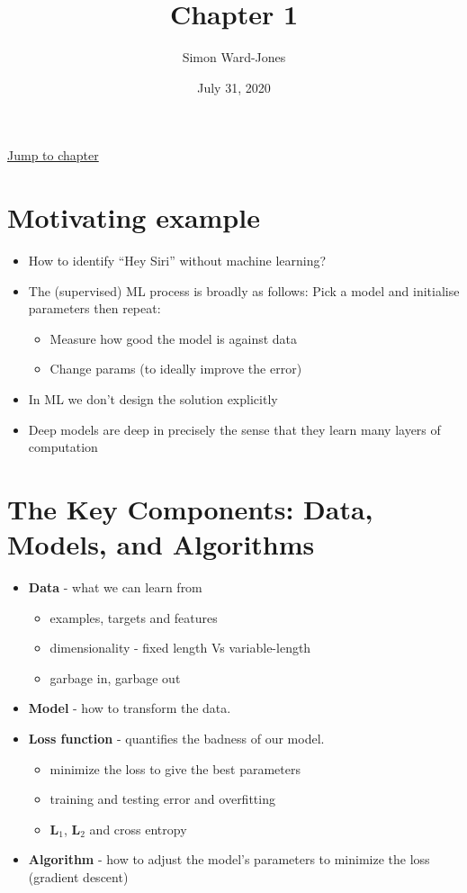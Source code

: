 \documentclass[12pt,notitlepage]{article}
\begin{document}


\title{\Large{\textbf{Chapter 1}}}
\date{July 31, 2020}
\author{Simon Ward-Jones}

\maketitle
\href{https://d2l.ai/chapter_introduction/index.html}{Jump to chapter}

\section{Motivating example}
\begin{itemize}
    \item How to identify ``Hey Siri'' without machine learning?
    \item The (supervised) ML process is broadly as follows:
          \subitem Pick a model and initialise parameters then repeat:
          \begin{itemize}
              \item Measure how good the model is against data
              \item Change params (to ideally improve the error)
          \end{itemize}
    \item In ML we don't design the solution explicitly
    \item Deep models are deep in precisely the sense that they learn many layers of computation
\end{itemize}

\section{The Key Components: Data, Models, and Algorithms}
\begin{itemize}
    \item \textbf{Data} - what we can learn from
          \begin{itemize}
              \item examples, targets and features
              \item dimensionality - fixed length Vs variable-length
              \item garbage in, garbage out
          \end{itemize}
    \item \textbf{Model} - how to transform the data.
    \item \textbf{Loss function} - quantifies the badness of our model.
          \begin{itemize}
              \item minimize the loss to give the best parameters
              \item training and testing error and overfitting
              \item $\mathbf{L}_1$, $\mathbf{L}_2$ and cross entropy
          \end{itemize}
    \item \textbf{Algorithm} - how to adjust the model’s parameters to minimize the loss (gradient descent)
\end{itemize}
\end{document}

